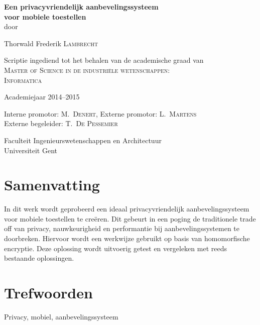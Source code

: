 
\newpage
{}
{
\setlength{\baselineskip}{12pt}
\setlength{\parindent}{0pt}
\setlength{\parskip}{6pt}

\begin{center}

\renewcommand{\baselinestretch}{1.1}
\noindent \huge \textbf{
Een privacyvriendelijk aanbevelingssysteem \\
voor mobiele toestellen 
} \\
\renewcommand{\baselinestretch}{1.3}
\normalsize
\vspace{3mm}
door 

Thorwald Frederik \textsc{Lambrecht}

Scriptie ingediend tot het behalen van de academische graad van\\
\textsc{Master of Science in de industri\"ele wetenschappen: \\Informatica}

Academiejaar 2014--2015

Interne promotor: M.~\textsc{Denert},
Externe promotor: L.~\textsc{Martens}\\
Externe begeleider: T.~\textsc{De Pessemier}

Faculteit Ingenieurswetenschappen en Architectuur\\
Universiteit Gent


\end{center}

\section*{Samenvatting}
In dit werk wordt geprobeerd een ideaal privacyvriendelijk aanbevelingssysteem voor mobiele toestellen te cre\"eren. Dit gebeurt in een poging de traditionele trade off van privacy, nauwkeurigheid en performantie bij aanbevelingssystemen te doorbreken. Hiervoor wordt een werkwijze gebruikt op basis van homomorfische encryptie. Deze oplossing wordt uitvoerig getest en vergeleken met reeds bestaande oplossingen.

\section*{Trefwoorden}
Privacy, mobiel, aanbevelingssysteem
}

\newpage %
